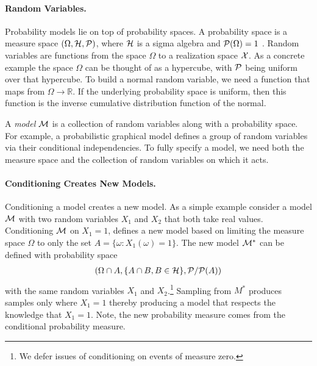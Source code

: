 \paragraph{Random Variables.} Probability models lie on top of probability
spaces. A probability space is a measure space $(\Omega, {\cal H}, {\cal P})$,
where ${\cal H}$ is a sigma algebra and ${\cal P}(\Omega) = 1$ \citep{ccinlar2011probability}. Random variables are
functions from the space $\Omega$ to a realization space ${\cal X}$. As a concrete
example the space $\Omega$ can be thought of as a hypercube, with ${\cal P}$ being
uniform over that hypercube. To build a normal random variable, we need a function
that maps from $\Omega \to \mathbb{R}$. If the underlying probability space is uniform, then
this function is the inverse cumulative distribution function of the normal.

A \emph{model} ${\cal M}$ is a collection of random variables along with a probability space.
For example, a probabilistic
graphical model defines a group of random variables via their conditional independencies.
To fully specify a model, we need both the measure space and the
collection of random variables on which it acts.

\paragraph{Conditioning Creates New Models.}
Conditioning a model
creates a new model. As a simple example consider a model ${\cal M}$ with two
random variables $X_1$ and $X_2$ that both take real values. Conditioning
${\cal M}$ on $X_1 = 1$, defines a new model based on limiting the measure space
$\Omega$ to only the set $A = \{ \omega : X_1(\omega) = 1\}$.
The new model ${\cal M}^*$ can be defined with probability space
\begin{align*}
	(\Omega \cap A, \{A \cap B, B \in {\cal H} \}, {\cal P} / {\cal P}(A))
\end{align*}
with the same random variables $X_1$ and $X_2$.\footnote{We defer issues of
	conditioning on events of measure zero.} Sampling from $M^*$ produces
samples only where $X_1 = 1$ thereby producing a model that respects the
knowledge that $X_1 = 1$. Note, the new probability measure comes
from the conditional probability measure.

